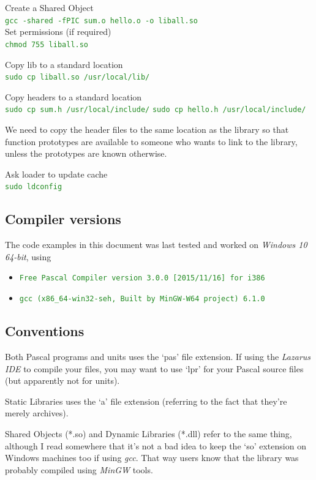 \documentclass[10pt,a4paper]{article}
\newcommand{\mytext}[1]{\textcolor{ForestGreen}{\texttt{#1}}}
\begin{document}
Create a Shared Object\\
\mytext{gcc -shared -fPIC sum.o hello.o -o liball.so}\\

Set permissions (if required)\\
\mytext{chmod 755 liball.so}

Copy lib to a standard location\\
\mytext{sudo cp liball.so /usr/local/lib/}

Copy headers to a standard location\\
\mytext{sudo cp sum.h /usr/local/include/}
\mytext{sudo cp hello.h /usr/local/include/}

We need to copy the header files to the same location as the library
so that function prototypes are available to someone
who wants to link to the library, unless the prototypes are known otherwise.

Ask loader to update cache\\
\mytext{sudo ldconfig}

\clearpage
\subsection{Compiler versions}
The code examples in this document was last tested and worked on
\textit{Windows 10 64-bit}, using
\begin{itemize}
\item \mytext{Free Pascal Compiler version 3.0.0 [2015/11/16] for i386}
\item \mytext{gcc (x86\_64-win32-seh, Built by MinGW-W64 project) 6.1.0}
\end{itemize}

\subsection{Conventions}
Both Pascal programs and units uses the `pas' file extension.
If using the \textit{Lazarus IDE} to compile your files, you may want to use `lpr' for your
Pascal source files (but apparently not for units).

Static Libraries uses the `a' file extension (referring to the fact that
they're merely archives).

Shared Objects (*.so) and Dynamic Libraries (*.dll) refer to the same thing, although I
read somewhere that it's not a bad idea to keep the `so' extension on Windows machines
too if using \textit{gcc}. That way users know that the library was probably compiled using
\textit{MinGW} tools.
\end{document}
